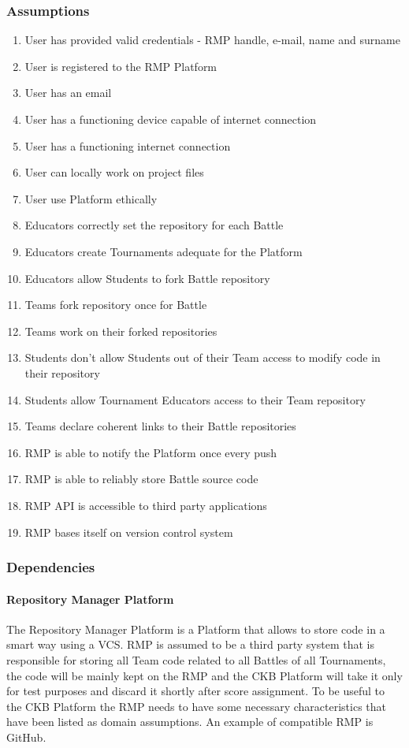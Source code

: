 \subsubsection{Assumptions}
\begin{enumerate}[label=$\bullet$ \textbf{D\arabic*:}]
    \item User has provided valid credentials - RMP handle, e-mail, name and surname
    \item User is registered to the RMP Platform
    \item User has an email
    \item User has a functioning device capable of internet connection
    \item User has a functioning internet connection
    \item User can locally work on project files
    \item User use Platform ethically
    \item Educators correctly set the repository for each Battle
    \item Educators create Tournaments adequate for the Platform
    \item Educators allow Students to fork Battle repository
    \item Teams fork repository once for Battle
    \item Teams work on their forked repositories
    \item Students don't allow Students out of their Team access to modify code in their repository
    \item Students allow Tournament Educators access to their Team repository
    \item Teams declare coherent links to their Battle repositories
    \item RMP is able to notify the Platform once every push
    \item RMP is able to reliably store Battle source code
    \item RMP API is accessible to third party applications
    \item RMP bases itself on version control system
\end{enumerate}
\subsubsection{Dependencies}
\paragraph{Repository Manager Platform}
The Repository Manager Platform is a Platform that allows to store code in a smart way using a VCS.
RMP is assumed to be a third party system that is responsible for storing all Team code related to all Battles of all Tournaments, the code will be mainly kept on the RMP and the CKB Platform will take it only for test purposes and discard it shortly after score assignment. 
To be useful to the CKB Platform the RMP needs to have some necessary characteristics that have been listed as domain assumptions.
An example of compatible RMP is GitHub.

